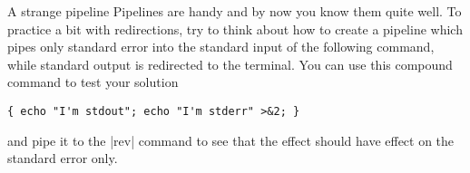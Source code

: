 
\begin{exercise}[Technical]{A strange pipeline}
    Pipelines are handy and by now you know them quite well.
    To practice a bit with redirections, try to think about how to create a pipeline which pipes only standard error into the standard input of the following command, while standard output is redirected to the terminal.
    You can use this compound command to test your solution
    \begin{lstlisting}[style=MyBash]
        { echo "I'm stdout"; echo "I'm stderr" >&2; }
    \end{lstlisting}
    and pipe it to the \bash|rev| command to see that the effect should have effect on the standard error only.
\end{exercise}
